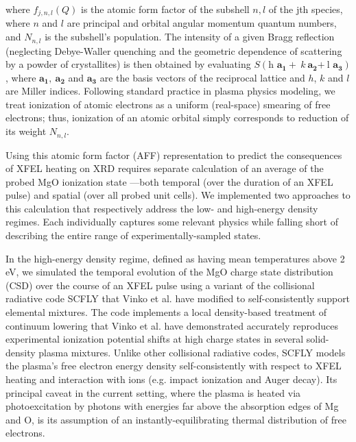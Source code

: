 where \(f_{j,n,l}\left( Q \right)\) is the atomic form factor of the
subshell \(n,l\) of the jth species, where \(n\) and \(l\) are principal
and orbital angular momentum quantum numbers, and \(N_{n,l}\) is the
subshell's population. The intensity of a given Bragg reflection
(neglecting Debye-Waller quenching and the geometric dependence of
scattering by a powder of crystallites) is then obtained by evaluating
\(S\left( \text{h\ }\mathbf{a}_{\mathbf{1}} + \ k\ \mathbf{a}_{\mathbf{2}}\mathbf{+ \ }\text{l\ }\mathbf{a}_{\mathbf{3}} \right)\),
where \(\mathbf{a}_{\mathbf{1}}\mathbf{,\ }\mathbf{a}_{\mathbf{2}}\) and
\(\mathbf{a}_{\mathbf{3}}\) are the basis vectors of the reciprocal
lattice and \(h\), \(k\) and \(l\) are Miller indices. Following
standard practice in plasma physics modeling, we treat ionization of
atomic electrons as a uniform (real-space) smearing of free electrons;
thus, ionization of an atomic orbital simply corresponds to reduction of
its weight \(N_{n,l}\). 

Using this atomic form factor (AFF) representation to predict the
consequences of XFEL heating on XRD requires separate calculation of an
average of the probed MgO ionization state ---both temporal (over the
duration of an XFEL pulse) and spatial (over all probed unit cells). We
implemented two approaches to this calculation that respectively address
the low- and high-energy density regimes. Each individually captures
some relevant physics while falling short of describing the entire range
of experimentally-sampled states.

In the high-energy density regime, defined as having mean temperatures
above 2 eV, we simulated the temporal evolution of the MgO charge state
distribution (CSD) over the course of an XFEL pulse using a variant of
the collisional radiative code SCFLY that Vinko et al. have modified to
self-consistently support elemental mixtures. The code implements a
local density-based treatment of continuum lowering that Vinko et al.
have demonstrated accurately reproduces experimental ionization
potential shifts at high charge states in several solid-density plasma
mixtures. Unlike other collisional
radiative codes, SCFLY models the plasma's free electron energy density
self-consistently with respect to XFEL heating and interaction with ions
(e.g. impact ionization and Auger decay). Its principal caveat in the
current setting, where the plasma is heated via photoexcitation by
photons with energies far above the absorption edges of Mg and O, is its
assumption of an instantly-equilibrating thermal distribution of free
electrons. 

